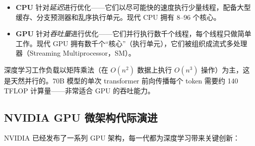 \begin{intuitionbox}
\begin{itemize}
  \item \textbf{CPU} 针对\emph{延迟}进行优化——它们以尽可能快的速度执行少量线程，配备大型缓存、分支预测器和乱序执行单元。现代 CPU 拥有 8--96 个核心。
  \item \textbf{GPU} 针对\emph{吞吐量}进行优化——它们并行执行数千个线程，每个线程只做简单工作。现代 GPU 拥有数千个“核心”（执行单元），它们被组织成流式多处理器（Streaming Multiprocessor，SM）。
\end{itemize}

深度学习工作负载以矩阵乘法（在 $O(n^2)$ 数据上执行 $O(n^3)$ 操作）为主，这是天然并行的。70B 模型的单次 transformer 前向传播每个 token 需要约 140 TFLOP 计算量——非常适合 GPU 的吞吐能力。
\end{intuitionbox}

\subsection{NVIDIA GPU 微架构代际演进}
\label{nvidia-gpu-microarchitecture-generations}

NVIDIA 已经发布了一系列 GPU 架构，每一代都为深度学习带来关键创新：

